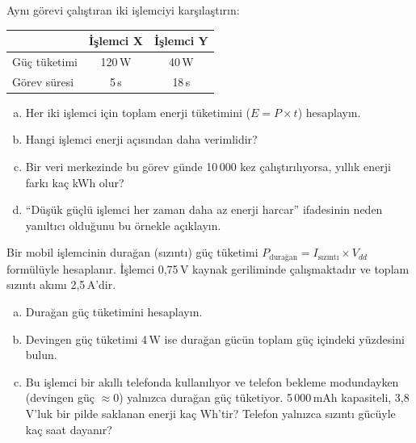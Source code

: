 \begin{alistirma}[\zor]
Aynı görevi çalıştıran iki işlemciyi karşılaştırın:

\smallskip
\begin{tabular}{@{}lcc@{}}
\toprule
 & \textbf{İşlemci X} & \textbf{İşlemci Y} \\
\midrule
Güç tüketimi & 120\,W & 40\,W \\
Görev süresi & 5\,s & 18\,s \\
\bottomrule
\end{tabular}
\smallskip

\begin{enumerate}[(a)]
    \item Her iki işlemci için toplam enerji tüketimini ($E = P \times t$) hesaplayın.
    \item Hangi işlemci enerji açısından daha verimlidir?
    \item Bir veri merkezinde bu görev günde 10\,000 kez çalıştırılıyorsa, yıllık enerji farkı kaç kWh olur?
    \item ``Düşük güçlü işlemci her zaman daha az enerji harcar'' ifadesinin neden yanıltıcı olduğunu bu örnekle açıklayın.
\end{enumerate}
\end{alistirma}

\begin{alistirma}[\orta]
Bir mobil işlemcinin durağan (sızıntı) güç tüketimi $P_{\text{durağan}} = I_{\text{sızıntı}} \times V_{dd}$ formülüyle hesaplanır. İşlemci 0{,}75\,V kaynak geriliminde çalışmaktadır ve toplam sızıntı akımı 2{,}5\,A'dir.
\begin{enumerate}[(a)]
    \item Durağan güç tüketimini hesaplayın.
    \item Devingen güç tüketimi 4\,W ise durağan gücün toplam güç içindeki yüzdesini bulun.
    \item Bu işlemci bir akıllı telefonda kullanılıyor ve telefon bekleme modundayken (devingen güç $\approx 0$) yalnızca durağan güç tüketiyor. 5\,000\,mAh kapasiteli, 3{,}8\,V'luk bir pilde saklanan enerji kaç Wh'tir? Telefon yalnızca sızıntı gücüyle kaç saat dayanır?
\end{enumerate}
\end{alistirma}


